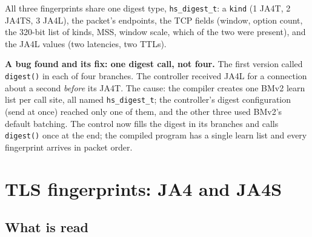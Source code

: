 \documentclass[11pt,a4paper]{article}
\newcommand{\code}[1]{\texttt{#1}}
\begin{document}
All three fingerprints share one digest type, \code{hs\_digest\_t}: a \code{kind} (1 JA4T, 2 JA4TS, 3 JA4L), the
packet's endpoints, the TCP fields (window, option count, the 320-bit list of kinds, MSS, window scale, which of the
two were present), and the JA4L values (two latencies, two TTLs).

\textbf{A bug found and its fix: one digest call, not four.} The first version called \code{digest()} in each of
four branches. The controller received JA4L for a connection about a second \emph{before} its JA4T. The cause: the
compiler creates one BMv2 learn list per call site, all named \code{hs\_digest\_t}; the controller's digest
configuration (send at once) reached only one of them, and the other three used BMv2's default batching. The
control now fills the digest in its branches and calls \code{digest()} once at the end; the compiled program has a
single learn list and every fingerprint arrives in packet order.

\section{TLS fingerprints: JA4 and JA4S}

\subsection{What is read}
\end{document}
